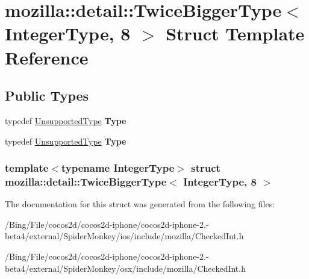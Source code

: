 \hypertarget{structmozilla_1_1detail_1_1_twice_bigger_type_3_01_integer_type_00_018_01_4}{\section{mozilla\-:\-:detail\-:\-:Twice\-Bigger\-Type$<$ Integer\-Type, 8 $>$ Struct Template Reference}
\label{structmozilla_1_1detail_1_1_twice_bigger_type_3_01_integer_type_00_018_01_4}
}
\subsection*{Public Types}
\begin{DoxyCompactItemize}
\item 
\hypertarget{structmozilla_1_1detail_1_1_twice_bigger_type_3_01_integer_type_00_018_01_4_a88eb80b262c663ab72625b7ea29ddea4}{typedef \hyperlink{structmozilla_1_1detail_1_1_unsupported_type}{Unsupported\-Type} {\bfseries Type}}\label{structmozilla_1_1detail_1_1_twice_bigger_type_3_01_integer_type_00_018_01_4_a88eb80b262c663ab72625b7ea29ddea4}

\item 
\hypertarget{structmozilla_1_1detail_1_1_twice_bigger_type_3_01_integer_type_00_018_01_4_a88eb80b262c663ab72625b7ea29ddea4}{typedef \hyperlink{structmozilla_1_1detail_1_1_unsupported_type}{Unsupported\-Type} {\bfseries Type}}\label{structmozilla_1_1detail_1_1_twice_bigger_type_3_01_integer_type_00_018_01_4_a88eb80b262c663ab72625b7ea29ddea4}

\end{DoxyCompactItemize}
\subsubsection*{template$<$typename Integer\-Type$>$ struct mozilla\-::detail\-::\-Twice\-Bigger\-Type$<$ Integer\-Type, 8 $>$}



The documentation for this struct was generated from the following files\-:\begin{DoxyCompactItemize}
\item 
/\-Bing/\-File/cocos2d/cocos2d-\/iphone/cocos2d-\/iphone-\/2.-\/beta4/external/\-Spider\-Monkey/ios/include/mozilla/Checked\-Int.\-h\item 
/\-Bing/\-File/cocos2d/cocos2d-\/iphone/cocos2d-\/iphone-\/2.-\/beta4/external/\-Spider\-Monkey/osx/include/mozilla/Checked\-Int.\-h\end{DoxyCompactItemize}
